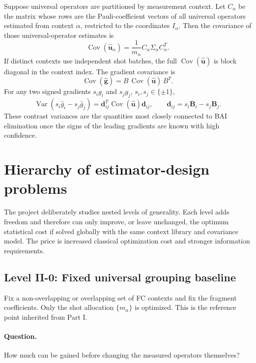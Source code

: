 \documentclass[11pt]{article}
\newcommand{\Var}{\operatorname{Var}}
\newcommand{\Cov}{\operatorname{Cov}}
\begin{document}
Suppose universal operators are partitioned by measurement context.  Let $C_\alpha$ be the matrix whose rows are the Pauli-coefficient vectors of all universal operators estimated from context $\alpha$, restricted to the coordinates $I_\alpha$.  Then the covariance of those universal-operator estimates is
\begin{equation}
  \Cov(\widehat{\bm u}_\alpha)
  =\frac{1}{m_\alpha}C_\alpha\Sigma_\alpha C_\alpha^T.
  \label{eq:u-cov}
\end{equation}
If distinct contexts use independent shot batches, the full $\Cov(\widehat{\bm u})$ is block diagonal in the context index.  The gradient covariance is
\begin{equation}
  \boxed{
  \Cov(\widehat{\bm g})
  =B\,\Cov(\widehat{\bm u})\,B^T.
  }
  \label{eq:g-cov}
\end{equation}
For any two signed gradients $s_i g_i$ and $s_j g_j$, $s_i,s_j\in\{\pm1\}$,
\begin{equation}
  \Var(s_i\widehat g_i-s_j\widehat g_j)
  =\bm d_{ij}^T\Cov(\widehat{\bm u})\bm d_{ij},
  \qquad
  \bm d_{ij}=s_i\bm B_i-s_j\bm B_j.
  \label{eq:contrast-var}
\end{equation}
These contrast variances are the quantities most closely connected to BAI elimination once the signs of the leading gradients are known with high confidence.

\section{Hierarchy of estimator-design problems}

The project deliberately studies nested levels of generality.  Each level adds freedom and therefore can only improve, or leave unchanged, the optimum statistical cost if solved globally with the same context library and covariance model.  The price is increased classical optimization cost and stronger information requirements.

\subsection{Level II-0: Fixed universal grouping baseline}

Fix a non-overlapping or overlapping set of FC contexts and fix the fragment coefficients.  Only the shot allocation $\{m_\alpha\}$ is optimized.  This is the reference point inherited from Part I.

\paragraph{Question.}
How much can be gained before changing the measured operators themselves?
\end{document}
